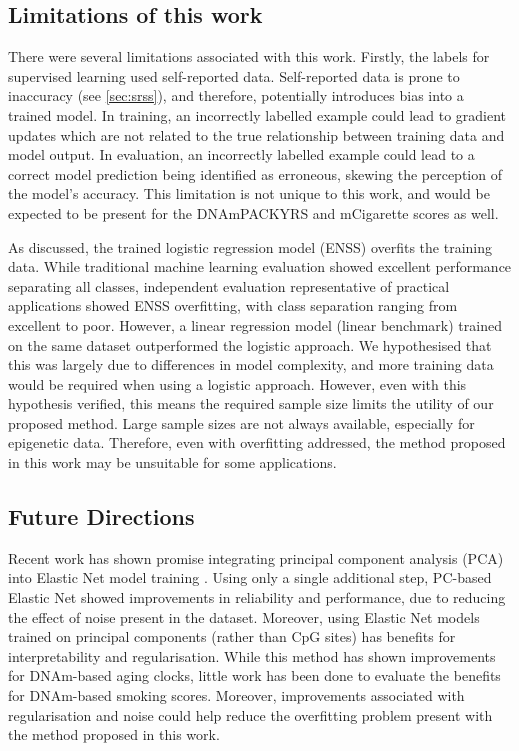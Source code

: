 \documentclass{article} %
\begin{document}
\subsection{Limitations of this work} \label{sec:limitations}
There were several limitations associated with this work. Firstly, the labels for supervised learning used self-reported data. Self-reported data is prone to inaccuracy (see
\ref{sec:srss}), and therefore, potentially introduces bias into a trained model. In training, an incorrectly labelled example could lead to gradient updates which are not related to the true relationship between training data and model output. In evaluation, an incorrectly labelled example could lead to a correct model prediction being identified as erroneous, skewing the perception of the model's accuracy. This limitation is not unique to this work, and would be expected to be present for the DNAmPACKYRS and mCigarette scores as well.

As discussed, the trained logistic regression model (ENSS) overfits the training data. While traditional machine learning evaluation showed excellent performance separating all classes, independent evaluation representative of practical applications showed ENSS overfitting, with class separation ranging from excellent to poor. However, a linear regression model (linear benchmark) trained on the same dataset outperformed the logistic approach. We hypothesised that this was largely due to differences in model complexity, and more training data would be required when using a logistic approach. However, even with this hypothesis verified, this means the required sample size limits the utility of our proposed method. Large sample sizes are not always available, especially for epigenetic data. Therefore, even with overfitting addressed, the method proposed in this work may be unsuitable for some applications.

\subsection{Future Directions}
Recent work has shown promise integrating principal component analysis (PCA) into Elastic Net model training \cite{higgins2022computational}. Using only a single additional step, PC-based Elastic Net showed improvements in reliability and performance, due to reducing the effect of noise present in the dataset. Moreover, using Elastic Net models trained on principal components (rather than CpG sites) has benefits for interpretability and regularisation. While this method has shown improvements for DNAm-based aging clocks, little work has been done to evaluate the benefits for DNAm-based smoking scores. Moreover, improvements associated with regularisation and noise could help reduce the overfitting problem present with the method proposed in this work.
\end{document}
